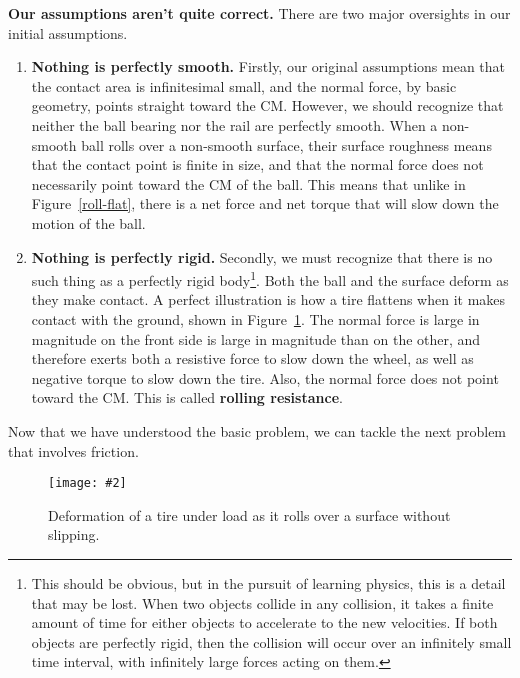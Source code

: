\documentclass{../../oss-handout}
\newcommand{\pic}[2]{\texttt{[image: \#2]}}
\begin{document}
\textbf{Our assumptions aren't quite correct.} There are two major oversights
in our initial assumptions.
\begin{enumerate}
\item\textbf{Nothing is perfectly smooth.} Firstly, our original assumptions
  mean that the contact area is infinitesimal small, and the normal force, by
  basic geometry, points straight toward the CM. However, we should recognize
  that neither the ball bearing nor the rail are perfectly smooth. When a
  non-smooth ball rolls over a non-smooth surface, their surface roughness
  means that the contact point is finite in size, and that the normal force
  does not necessarily point toward the CM of the ball. This means that unlike
  in Figure~\ref{roll-flat}, there is a net force and net torque that will slow
  down the motion of the ball.
\item\textbf{Nothing is perfectly rigid.} Secondly, we must recognize that
  there is no such thing as a perfectly rigid body\footnote{This should be
    obvious, but in the pursuit of learning physics, this is a detail that may
    be lost. When two objects collide in any collision, it takes a finite
    amount of time for either objects to accelerate to the new velocities. If
    both objects are perfectly rigid, then the collision will occur over an
    infinitely small time interval, with infinitely large forces acting on
    them.}. Both the ball and the surface deform as they make contact. A
  perfect illustration is how a tire flattens when it makes contact with the
  ground, shown in Figure~\ref{tire1}. The normal force is large in magnitude on
  the front side is large in magnitude than on the other, and therefore exerts
  both a resistive force to slow down the wheel, as well as negative torque to
  slow down the tire. Also, the normal force does not point toward the CM. This
  is called \textbf{rolling resistance}.
\end{enumerate}  
Now that we have understood the basic problem, we can tackle the next problem
that involves friction.
\begin{figure}[!ht]
  \centering
  \pic{.3}{../OAGZy}
  \caption{Deformation of a tire under load as it rolls over a surface
    without slipping.}
  \label{tire1}
\end{figure}
\end{document}
